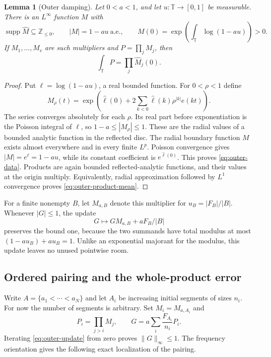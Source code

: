 \documentclass[11pt,reqno]{amsart}
\numberwithin{equation}{section}
\newtheorem{lemma}[theorem]{Lemma}
\theoremstyle{definition}
\theoremstyle{remark}
\newcommand{\Z}{\mathbb Z}
\newcommand{\T}{\mathbb T}
\newcommand{\norm}[1]{\lVert#1\rVert}
\DeclareMathOperator{\supp}{supp}
\begin{document}
\begin{lemma}[Outer damping]\label{lem:outer}
Let $0<a<1$, and let $u:\T\to[0,1]$ be measurable. There is an
$L^\infty$ function $M$ with
\begin{equation}\label{eq:outer-data}
 \supp\widehat M\subseteq\Z_{\le0},\qquad
 |M|=1-au\ \text{a.e.},\qquad
 \widehat M(0)=\exp\!\left(\int_\T\log(1-au)\right)>0.
\end{equation}
If $M_1,\ldots,M_v$ are such multipliers and $P=\prod_jM_j$, then
\begin{equation}\label{eq:outer-product-mean}
 \int_\T P=\prod_j\widehat M_j(0).
\end{equation}
\end{lemma}
\begin{proof}
Put $\ell=\log(1-au)$, a real bounded function. For $0<\rho<1$ define
\[
 M_\rho(t)=\exp\!\left(\widehat\ell(0)
       +2\sum_{k<0}\widehat\ell(k)\rho^{|k|}e(kt)\right).
\]
The series converges absolutely for each $\rho$. Its real part before
exponentiation is the Poisson integral of $\ell$, so
$1-a\le |M_\rho|\le1$. These are the radial values of a bounded analytic
function in the reflected disc. The radial boundary function $M$ exists
almost everywhere and in every finite $L^p$. Poisson convergence gives
$|M|=e^\ell=1-au$, while its constant coefficient is
$e^{\widehat\ell(0)}$. This proves \eqref{eq:outer-data}. Products are
again bounded reflected-analytic functions, and their values at the
origin multiply. Equivalently, radial approximation followed by
$L^1$ convergence proves \eqref{eq:outer-product-mean}.
\end{proof}

For a finite nonempty $B$, let $M_{a,B}$ denote this multiplier for
$u_B=|F_B|/|B|$. Whenever $|G|\le1$, the update
\begin{equation}\label{eq:outer-update}
 G\longmapsto GM_{a,B}+aF_B/|B|
\end{equation}
preserves the bound one, because the two summands have total modulus at
most $(1-au_B)+au_B=1$. Unlike an exponential majorant for the modulus,
this update leaves no unused pointwise room.

\subsection{Ordered pairing and the whole-product error}

Write $A=\{a_1<\cdots<a_N\}$ and let $A_i$ be increasing initial
segments of sizes $n_i$. For now the number of segments is arbitrary.
Set $M_i=M_{a,A_i}$ and
\begin{equation}\label{eq:test-function}
 P_i=\prod_{j>i}M_j,\qquad
 G=a\sum_i\frac{F_{A_i}}{n_i}P_i.
\end{equation}
Iterating \eqref{eq:outer-update} from zero proves $\norm G_\infty\le1$.
The frequency orientation gives the following exact localization of the
pairing.
\end{document}
